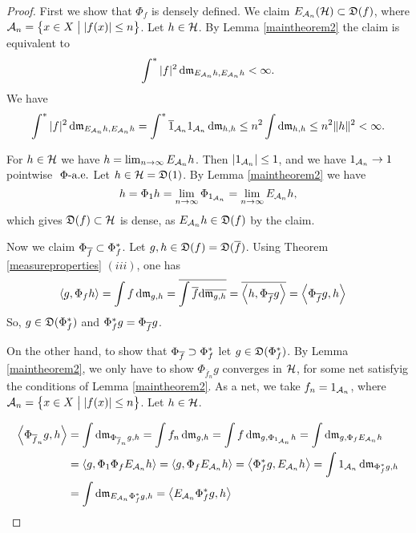 \begin{proof}

First we show that $\Phi_f$ is densely defined. \newline
We claim $E_{\mathcal{A}_n}(\mathcal{H}) \subset \mathfrak{D}(f)$, where $\mathcal{A}_n = 
\left\lbrace x \in X \bigm | | f(x) | \leq n \right\rbrace$.
Let $h \in \mathcal{H}$. By Lemma \ref{maintheorem2} the claim is
equivalent to 
\[
\int ^{*} |f|^2 \operatorname{d}\! \mathfrak{m}_{E_{\mathcal{A}_n}h, E_{\mathcal{A}_n}h} < \infty.
\]
We have 
\begin{align*}
  \int ^{*} |f|^2 \operatorname{d}\! \mathfrak{m}_{E_{\mathcal{A}_n}h, E_{\mathcal{A}_n}h} = 
  \int ^{*} \overline{1}_{\mathcal{A}_n} 1_{\mathcal{A}_n} \operatorname{d}\! \mathfrak{m}_{h,h} \leq
  n^2 \int \operatorname{d}\! \mathfrak{m}_{h,h} \leq n^2 \| h\|^2 < \infty.
\end{align*}

For $h \in \mathcal{H}$ we have $h = \lim_{n \to \infty} E_{\mathcal{A}_n} h$. 
Then $|1_{\mathcal{A}_n}| \leq 1$, and we have
$1_{\mathcal{A}_n} \to 1 $ pointwise $~\Phi\text{-a.e.}$
Let $h \in \mathcal{H} = \mathfrak{D}(1)$. By Lemma \ref{maintheorem2} we have
\[
h = \Phi_1 h = \lim_{n \to \infty} \Phi_{1_{\mathcal{A}_n}} =
\lim_{n \to \infty} E_{\mathcal{A}_n} h , 
\]
which gives $\mathfrak{D}(f) \subset \mathcal{H}$ is dense, as $E_{\mathcal{A}_n} h \in \mathfrak{D}(f)$ by
the claim. 

Now we claim $ \Phi_{\overline{f}} \subset \Phi_f ^{*}$.\newline
Let  $g,h \in \mathfrak{D}(f) = \mathfrak{D}(\overline{f})$. Using Theorem \ref{measureproperties} $
(iii)$, one has
\begin{align*}
  \left\langle g, \Phi_f h \right\rangle &= \int f \operatorname{d}\! \mathfrak{m}_{g,h} 
  = \overline{ \int \overline{f} \text{d}\overline{\mathfrak{m}_{g,h}}} 
  = \overline{ \left\langle h , \Phi_{\overline{f}} g  \right\rangle} 
  = \left\langle \Phi_{\overline{f} }g , h \right\rangle
\end{align*}
So, $g \in \mathfrak{D}(\Phi_f ^{*})$ and $\Phi_f ^{*} g = \Phi_{\overline{f}} g$.

On the other hand, to show that  $\Phi_{\overline{f}} \supset \Phi_f ^{*}$
let $g\in \mathfrak{D}(\Phi_f ^{*})$.
By Lemma \ref{maintheorem2}, we only have to show $\Phi_{\overline{f}_n}g$
converges in $\mathcal{H}$, for some net satisfyig the conditions of Lemma
\ref{maintheorem2}. As a net, we take $f_n = 1_{\mathcal{A}_n}$,
where $\mathcal{A}_n = \left\lbrace x \in X \bigm | | f(x) | \leq n \right\rbrace$.
Let $h \in \mathcal{H}$.

\begin{align*}
\left\langle  \Phi_{\overline{f}_n} g, h  \right\rangle& = \int \operatorname{d}\! \mathfrak{m}_{\Phi_{\overline{f}_n} g, h}
= \int f_n \operatorname{d}\! \mathfrak{m}_{g,h} 
= \int f \operatorname{d}\! \mathfrak{m}_{g, \Phi_{1_{\mathcal{A}_n }} h }
= \int \operatorname{d}\! \mathfrak{m}_{g, \Phi_f E_{\mathcal{A}_n} h} \\
&= \left\langle g, \Phi_1 \Phi_f E_{\mathcal{A}_n }h  \right\rangle
= \left\langle g, \Phi_f E_{\mathcal{A}_n} h \right\rangle 
= \left\langle \Phi_f ^{*} g, E_{\mathcal{A}_n} h \right\rangle
= \int 1_{\mathcal{A}_n} \operatorname{d}\! \mathfrak{m}_{\Phi_f ^{*} g, h}\\
&= \int \operatorname{d}\! \mathfrak{m}_{E_{\mathcal{A}_n} \Phi_f ^{*} g, h} = \left\langle E_{\mathcal{A}_n}  \Phi_f ^{*} g, h \right\rangle
\end{align*}


\end{proof}

